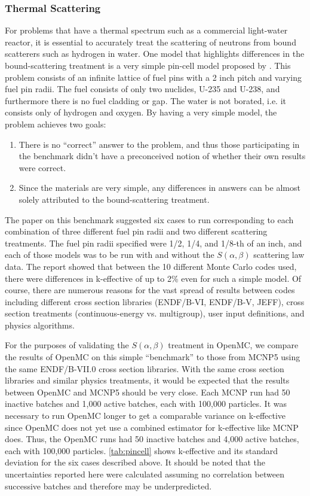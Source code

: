 \documentclass[authoryear,preprint]{elsarticle}
\begin{document}
\subsubsection{Thermal Scattering}

For problems that have a thermal spectrum such as a commercial light-water
reactor, it is essential to accurately treat the scattering of neutrons from
bound scatterers such as hydrogen in water. One model that highlights
differences in the bound-scattering treatment is a very simple pin-cell model
proposed by \citet{pincell}. This problem consists of an infinite lattice of
fuel pins with a 2 inch pitch and varying fuel pin radii. The fuel consists of
only two nuclides, U-235 and U-238, and furthermore there is no fuel cladding or
gap. The water is not borated, i.e. it consists only of hydrogen and oxygen. By
having a very simple model, the problem achieves two goals:
\begin{enumerate}
  \item There is no ``correct'' answer to the problem, and thus those
    participating in the benchmark didn't have a preconceived notion of whether
    their own results were correct.
  \item Since the materials are very simple, any differences in answers can be
    almost solely attributed to the bound-scattering treatment.
\end{enumerate}

The paper on this benchmark suggested six cases to run corresponding to each
combination of three different fuel pin radii and two different scattering
treatments. The fuel pin radii specified were 1/2, 1/4, and 1/8-th of an inch,
and each of those models was to be run with and without the $S(\alpha,\beta)$
scattering law data. The report showed that between the 10 different Monte Carlo
codes used, there were differences in k-effective of up to 2\% even for such a
simple model. Of course, there are numerous reasons for the vast spread of
results between codes including different cross section libraries (ENDF/B-VI,
ENDF/B-V, JEFF), cross section treatments (continuous-energy vs. multigroup),
user input definitions, and physics algorithms.

For the purposes of validating the $S(\alpha,\beta)$ treatment in OpenMC, we
compare the results of OpenMC on this simple ``benchmark'' to those from MCNP5
using the same ENDF/B-VII.0 cross section libraries. With the same cross section
libraries and similar physics treatments, it would be expected that the results
between OpenMC and MCNP5 should be very close. Each MCNP run had 50 inactive
batches and 1,000 active batches, each with 100,000 particles. It was necessary
to run OpenMC longer to get a comparable variance on k-effective since OpenMC
does not yet use a combined estimator for k-effective like MCNP does. Thus, the
OpenMC runs had 50 inactive batches and 4,000 active batches, each with 100,000
particles. \autoref{tab:pincell} shows k-effective and its standard deviation
for the six cases described above. It should be noted that the uncertainties
reported here were calculated assuming no correlation between successive batches
and therefore may be underpredicted.
\end{document}

